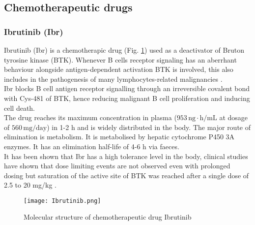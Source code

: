 \subsection{Chemotherapeutic drugs}
\subsubsection{Ibrutinib (Ibr)}
Ibrutinib (Ibr) is a chemotherapic drug (Fig. \ref{fig:Ibr}) used as a deactivator of Bruton tyrosine kinase (BTK). Whenever B cells receptor signaling has an aberrhant behaviour alongside antigen-dependent activation BTK is involved, this also includes in the pathogenesis of many lymphocytes-related malignancies \cite{ibr-1}.\\
Ibr blocks B cell antigen receptor signalling through an irreversible covalent bond with Cys-481 of BTK, hence reducing malignant B cell proliferation and inducing cell death.\\
The drug reaches its maximum concentration in plasma ($953\,\text{ng}\cdot\text{h}/\text{mL}$ at dosage of $560\,\text{mg}/\text{day}$) in 1-2 h and is widely distributed in the body. The major route of elimination is metabolism. It is metabolised by hepatic cytochrome P450 3A enzymes. It has an elimination half-life of 4-6 h via faeces.\\
It has been shown that Ibr has a high tolerance level in the body, clinical studies have shown that dose limiting events are not observed even with prolonged dosing \cite{ibr-2} but saturation of the active site of BTK was reached after a single dose of 2.5 to 20 mg/kg \cite{ibr-pubchem}. 
\begin{figure}[htbp!]
	\centering
	\texttt{[image: Ibrutinib.png]}
	\caption{Molecular structure of chemotherapeutic drug Ibrutinib}
	\label{fig:Ibr}
\end{figure}

